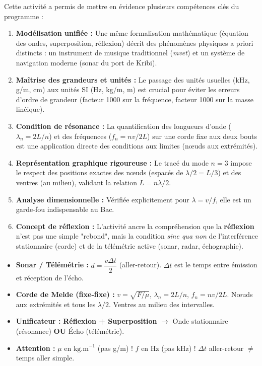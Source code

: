 \documentclass[11pt]{article}
\newcounter{popsec}
\newcounter{popsub}
\newcommand{\courssub}[1]{%
  \stepcounter{popsub}%
  \par\vspace{9pt}\noindent{\popxbold\fontsize{11.5}{13}\selectfont\color{popink}{\color{poporange}\thepopsec.\thepopsub}\hspace{6pt}#1}\par\nopagebreak\vspace{4pt}
}
\begin{document}
\courssub{Bilan de l'activité}
Cette activité a permis de mettre en évidence plusieurs compétences clés du programme :
\begin{enumerate}
    \item \textbf{Modélisation unifiée :} Une même formalisation mathématique (équation des ondes, superposition, réflexion) décrit des phénomènes physiques a priori distincts : un instrument de musique traditionnel (\emph{mvet}) et un système de navigation moderne (sonar du port de Kribi).
    \item \textbf{Maîtrise des grandeurs et unités :} Le passage des unités usuelles (kHz, g/m, cm) aux unités SI (Hz, kg/m, m) est crucial pour éviter les erreurs d'ordre de grandeur (facteur 1000 sur la fréquence, facteur 1000 sur la masse linéique).
    \item \textbf{Condition de résonance :} La quantification des longueurs d'onde ($\lambda_n = 2L/n$) et des fréquences ($f_n = n v/2L$) sur une corde fixe aux deux bouts est une application directe des conditions aux limites (nœuds aux extrémités).
    \item \textbf{Représentation graphique rigoureuse :} Le tracé du mode $n=3$ impose le respect des positions exactes des nœuds (espacés de $\lambda/2 = L/3$) et des ventres (au milieu), validant la relation $L = n\lambda/2$.
    \item \textbf{Analyse dimensionnelle :} Vérifiée explicitement pour $\lambda = v/f$, elle est un garde-fou indispensable au Bac.
    \item \textbf{Concept de réflexion :} L'activité ancre la compréhension que la \textbf{réflexion} n'est pas une simple "rebond", mais la condition \emph{sine qua non} de l'interférence stationnaire (corde) et de la télémétrie active (sonar, radar, échographie).
\end{enumerate}

\begin{aretenir}
\begin{itemize}
    \item \textbf{Sonar / Télémétrie :} $d = \dfrac{v \Delta t}{2}$ (aller-retour). $\Delta t$ est le temps entre émission et réception de l'écho.
    \item \textbf{Corde de Melde (fixe-fixe) :} $v = \sqrt{F/\mu}$, $\lambda_n = 2L/n$, $f_n = n v/2L$. Nœuds aux extrémités et tous les $\lambda/2$. Ventres au milieu des intervalles.
    \item \textbf{Unificateur :} \textbf{Réflexion + Superposition} $\rightarrow$ Onde stationnaire (résonance) \textbf{OU} Écho (télémétrie).
    \item \textbf{Attention :} $\mu$ en $\text{kg.m}^{-1}$ (pas g/m) ! $f$ en Hz (pas kHz) ! $\Delta t$ aller-retour $\neq$ temps aller simple.
\end{itemize}
\end{aretenir}
\end{document}
